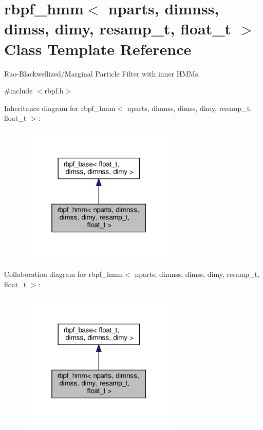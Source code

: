 \hypertarget{classrbpf__hmm}{}\section{rbpf\+\_\+hmm$<$ nparts, dimnss, dimss, dimy, resamp\+\_\+t, float\+\_\+t $>$ Class Template Reference}
\label{classrbpf__hmm}


Rao-\/\+Blackwellized/\+Marginal Particle Filter with inner H\+M\+Ms.  




{\ttfamily \#include $<$rbpf.\+h$>$}



Inheritance diagram for rbpf\+\_\+hmm$<$ nparts, dimnss, dimss, dimy, resamp\+\_\+t, float\+\_\+t $>$\+:\nopagebreak
\begin{figure}[H]
\begin{center}
\leavevmode
\includegraphics[width=217pt]{classrbpf__hmm__inherit__graph}
\end{center}
\end{figure}


Collaboration diagram for rbpf\+\_\+hmm$<$ nparts, dimnss, dimss, dimy, resamp\+\_\+t, float\+\_\+t $>$\+:\nopagebreak
\begin{figure}[H]
\begin{center}
\leavevmode
\includegraphics[width=217pt]{classrbpf__hmm__coll__graph}
\end{center}
\end{figure}
